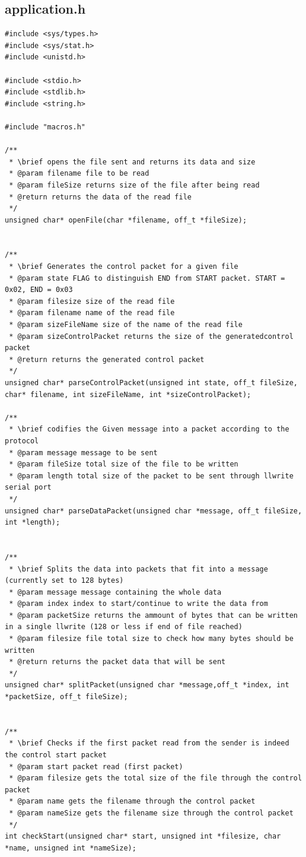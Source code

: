 \documentclass{article}
\begin{document}
\subsection{application.h}

\begin{lstlisting}[style=CStyle]
#include <sys/types.h>
#include <sys/stat.h>
#include <unistd.h>

#include <stdio.h>
#include <stdlib.h>
#include <string.h>

#include "macros.h"

/**
 * \brief opens the file sent and returns its data and size
 * @param filename file to be read
 * @param fileSize returns size of the file after being read
 * @return returns the data of the read file
 */
unsigned char* openFile(char *filename, off_t *fileSize);


/**
 * \brief Generates the control packet for a given file
 * @param state FLAG to distinguish END from START packet. START = 0x02, END = 0x03
 * @param filesize size of the read file
 * @param filename name of the read file
 * @param sizeFileName size of the name of the read file
 * @param sizeControlPacket returns the size of the generatedcontrol packet
 * @return returns the generated control packet
 */
unsigned char* parseControlPacket(unsigned int state, off_t fileSize, char* filename, int sizeFileName, int *sizeControlPacket);

/**
 * \brief codifies the Given message into a packet according to the protocol
 * @param message message to be sent
 * @param fileSize total size of the file to be written
 * @param length total size of the packet to be sent through llwrite serial port
 */
unsigned char* parseDataPacket(unsigned char *message, off_t fileSize, int *length);


/**
 * \brief Splits the data into packets that fit into a message (currently set to 128 bytes)
 * @param message message containing the whole data
 * @param index index to start/continue to write the data from
 * @param packetSize returns the ammount of bytes that can be written in a single llwrite (128 or less if end of file reached)
 * @param filesize file total size to check how many bytes should be written
 * @return returns the packet data that will be sent
 */
unsigned char* splitPacket(unsigned char *message,off_t *index, int *packetSize, off_t fileSize);


/**
 * \brief Checks if the first packet read from the sender is indeed the control start packet
 * @param start packet read (first packet)
 * @param filesize gets the total size of the file through the control packet
 * @param name gets the filename through the control packet
 * @param nameSize gets the filename size through the control packet
 */
int checkStart(unsigned char* start, unsigned int *filesize, char *name, unsigned int *nameSize);



\end{lstlisting}
\end{document}
